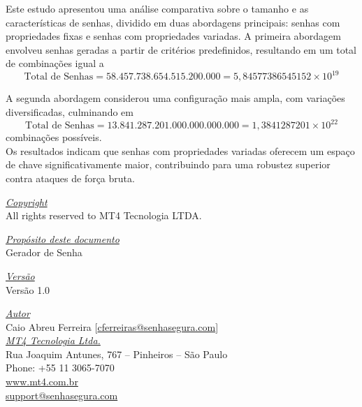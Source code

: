 \documentclass{article}
\begin{document}
Este estudo apresentou uma análise comparativa sobre o tamanho e as características de senhas, dividido em duas abordagens principais: senhas com propriedades fixas e senhas com propriedades variadas. A primeira abordagem envolveu senhas geradas a partir de critérios predefinidos, resultando em um total de combinações igual a 
\[
\text{Total de Senhas} = 58.457.738.654.515.200.000 = 5,84577386545152 \times 10^{19}
\]

A segunda abordagem considerou uma configuração mais ampla, com variações diversificadas, culminando em 
\[
\text{Total de Senhas} = 13.841.287.201.000.000.000.000 = 1,3841287201 \times 10^{22}
\]
combinações possíveis.\\

Os resultados indicam que senhas com propriedades variadas oferecem um espaço de chave significativamente maior, contribuindo para uma robustez superior contra ataques de força bruta.

\pagebreak

\vspace*{\fill}
\begin{flushright}
	\underline{\textit{Copyright}}\\
	All rights reserved to MT4 Tecnologia LTDA.\bigskip

	\underline{\textit{Propósito deste documento}}\\
	Gerador de Senha\bigskip

	\underline{\textit{Versão}}\\
	Versão 1.0\bigskip

	\underline{\textit{Autor}}\\
	Caio Abreu Ferreira [\href{mailto:cferreira@senhasegura.com}{cferreiras@senhasegura.com}] \bigskip\\
	
	\underline{\textit{MT4 Tecnologia Ltda.}}\\
	Rua Joaquim Antunes, 767 – Pinheiros – São Paulo\\
	Phone: +55 11 3065-7070\\
	\url{www.mt4.com.br}\\
	\href{mailto:support@senhasegura.com}{support@senhasegura.com}\\
\end{flushright}
\end{document}
